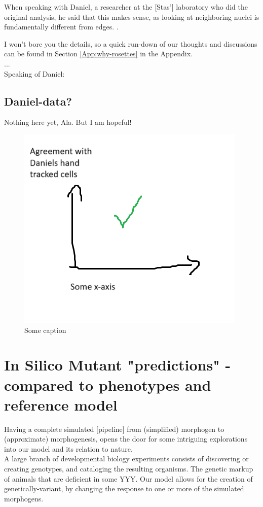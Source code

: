 When speaking with Daniel, a researcher at the [Stas'] laboratory who did the original analysis, he said that this makes sense, as looking at neighboring nuclei is fundamentally different from edges. . 

I won't bore you the details, so a quick run-down of our thoughts and discussions can be found in Section \ref{App:why-rosettes} in the Appendix.\\

... \\
Speaking of Daniel:


\subsection{Daniel-data?}
Nothing here yet, Ala. But I am hopeful!
\begin{figure}[H]
    \centering
    \includegraphics[width=0.7\linewidth]{chapters/Results/figures/daniel_placeholder.png}
    \caption{Some caption}
    \label{fig:enter-label}
\end{figure}
\newpage
\section{In Silico Mutant "predictions" - compared to phenotypes and reference model}
Having a complete simulated [pipeline] from (simplified) morphogen to (approximate) morphogenesis, opens the door for some intriguing explorations into our model and its relation to nature.\\

A large branch of developmental biology experiments consists of discovering or creating genotypes, and cataloging the resulting organisms. The genetic markup of animals that are deficient in some YYY. 
Our model allows for the creation of genetically-variant, by changing the response to one or more of the simulated morphogens.\\


